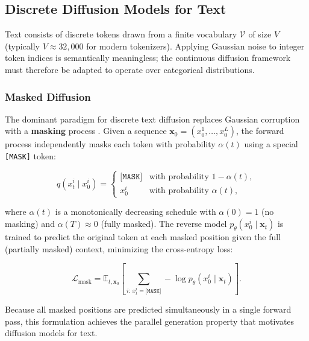 \documentclass[11pt, a4paper]{article}
\begin{document}
\subsection{Discrete Diffusion Models for Text}
\label{subsec:discrete_diffusion}

Text consists of discrete tokens drawn from a finite vocabulary $\mathcal{V}$ of size $V$
(typically $V \approx 32{,}000$ for modern tokenizers). Applying Gaussian noise to integer
token indices is semantically meaningless; the continuous diffusion framework must therefore
be adapted to operate over categorical distributions.

\subsubsection{Masked Diffusion}
\label{subsubsec:masked_diffusion}

The dominant paradigm for discrete text diffusion replaces Gaussian corruption with a
\textbf{masking} process \cite{sahoo2024mdlm, nie2025llada}. Given a sequence
$\mathbf{x}_0 = (x_0^1, \ldots, x_0^L)$, the forward process independently masks each
token with probability $\alpha(t)$ using a special \texttt{[MASK]} token:

\begin{equation}
    q(x_t^i \mid x_0^i) =
    \begin{cases}
        \texttt{[MASK]} & \text{with probability } 1 - \alpha(t), \\
        x_0^i           & \text{with probability } \alpha(t),
    \end{cases}
    \label{eq:mask_forward}
\end{equation}

\noindent where $\alpha(t)$ is a monotonically decreasing schedule with $\alpha(0) = 1$
(no masking) and $\alpha(T) \approx 0$ (fully masked). The reverse model
$p_\theta(x_0^i \mid \mathbf{x}_t)$ is trained to predict the original token at each
masked position given the full (partially masked) context, minimizing the cross-entropy
loss:

\begin{equation}
    \mathcal{L}_{\text{mask}} = \mathbb{E}_{t, \mathbf{x}_0}\!\left[
    \sum_{i:\, x_t^i = \texttt{[MASK]}}
    -\log p_\theta\!\left(x_0^i \mid \mathbf{x}_t\right) \right].
    \label{eq:mask_loss}
\end{equation}

\noindent Because all masked positions are predicted simultaneously in a single forward
pass, this formulation achieves the parallel generation property that motivates diffusion
models for text.
\end{document}
